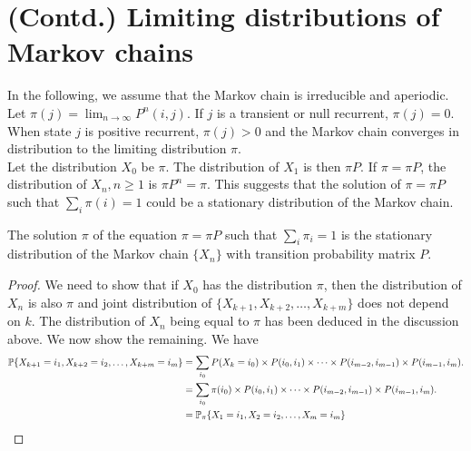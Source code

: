 \documentclass[all-lectures.tex]{subfiles}
\begin{document}

\setcounter{section}{1}
\setcounter{subsection}{0}

\section*{}
\section{(Contd.) Limiting distributions of Markov chains}
In the following, we assume that the Markov chain is irreducible and aperiodic. \\
\indent Let $\pi(j) = \lim_{n\rightarrow \infty} P^n(i,j)$. If $j$ is a transient or null recurrent, $\pi(j) = 0$. When state $j$ is positive recurrent, $\pi(j) > 0$ and the Markov chain converges in distribution to the limiting distribution $\pi$. \\
\indent Let the distribution $X_0$ be $\pi$. The distribution of $X_1$ is then $\pi P$. If $\pi = \pi P$, the distribution of $X_n, n \geq 1$ is $\pi P^n = \pi$. This suggests that the solution of $\pi = \pi P$ such that $\sum_i \pi(i) = 1$ could be a stationary distribution of the Markov chain.
\begin{prop}
The solution $\pi$ of the equation $\pi = \pi P$ such that $\sum_i \pi_i = 1$ is the stationary distribution of the Markov chain $\{X_n\}$ with transition probability matrix $P$.
\begin{proof}
We need to show that if $X_0$ has the distribution $\pi$, then the distribution of $X_n$ is also $\pi$ and joint distribution of $\{X_{k+1},X_{k+2},\dots,X_{k+m}\}$ does not depend on $k$. The distribution of $X_n$ being equal to $\pi$ has been deduced in the discussion above. We now show the remaining. We have 
\begin{align*}
\P\{X_{k+1} = i_1,X_{k+2} = i_2,\dots,X_{k+m} = i_m\} &= \sum_{i_0} P(X_{k} = i_0) \times P(i_{0},i_{1}) \times \dots \times P(i_{m-2},i_{m-1}) \times P(i_{m-1},i_{m}) . \\
&= \sum_{i_0} \pi(i_0) \times P(i_{0},i_{1}) \times \dots  \times P(i_{m-2},i_{m-1}) \times P(i_{m-1},i_{m}). \\
&= \P_{\pi}\{X_{1} = i_1,X_{2} = i_2,\dots,X_{m} = i_m\} 
\end{align*}
\end{proof}
\end{prop}
\end{document}
